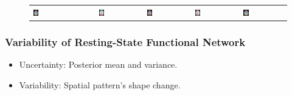 \documentclass[serif]{beamer}
\begin{document}
\begin{frame}
\begin{figure}[htb]
\begin{tabular}{lcc|cc|cc}
\includegraphics[width=0.13\textwidth]{figure2/mrf_grp_z32} &
\includegraphics[width=0.13\textwidth]{figure2/mrf_sub1_z25} &
\includegraphics[width=0.13\textwidth]{figure2/mrf_sub1_z32} &
\includegraphics[width=0.13\textwidth]{figure2/mrf_sub2_z25} &
\includegraphics[width=0.13\textwidth]{figure2/mrf_sub2_z32}
\end{tabular}
\end{figure}

\end{frame}

\begin{frame}
\frametitle{Variability of Resting-State Functional Network}
\begin{block}{}
  \begin{itemize}
    \item Uncertainty: Posterior mean and variance.
    \item Variability: Spatial pattern's shape change.
  \end{itemize}
\end{block}
\end{frame}
\end{document}
